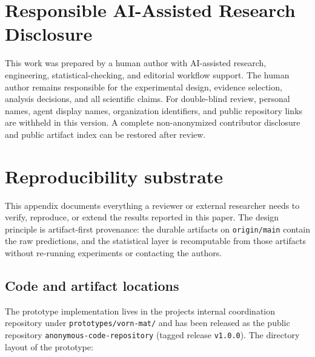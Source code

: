\documentclass[10pt]{article}
\begin{document}
\section{Responsible AI-Assisted Research Disclosure}\label{responsible-ai-assisted-research-disclosure}

This work was prepared by a human author with AI-assisted research,
engineering, statistical-checking, and editorial workflow support. The
human author remains responsible for the experimental design, evidence
selection, analysis decisions, and all scientific claims. For double-blind
review, personal names, agent display names, organization identifiers,
and public repository links are withheld in this version. A complete
non-anonymized contributor disclosure and public artifact index can be
restored after review.



\appendix

\section{Reproducibility substrate}\label{appendix-a-reproducibility-substrate}

This appendix documents everything a reviewer or external researcher
needs to verify, reproduce, or extend the results reported in this
paper. The design principle is artifact-first provenance: the durable
artifacts on \texttt{origin/main} contain the raw predictions, and the
statistical layer is recomputable from those artifacts without
re-running experiments or contacting the authors.

\subsection{Code and artifact locations}\label{a1-code-and-artifact-locations}

The prototype implementation lives in the project\textquotesingle s internal
coordination repository under \texttt{prototypes/vorn-mat/} and has been
released as the public repository \texttt{anonymous-code-repository} (tagged
release \texttt{v1.0.0}). The directory layout of the prototype:
\end{document}
